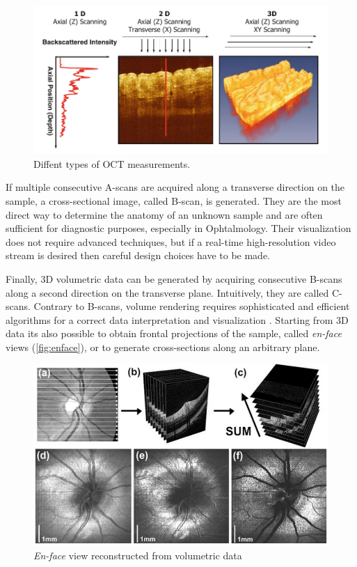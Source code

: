  \begin{figure}[hbt]
	\myfloatalign
	\includegraphics[width=\linewidth]{gfx/ch2/terminology}
	\caption{Diffent types of OCT measurements. \cite{Drexler2015}}\label{fig:terminology}
\end{figure}

If multiple consecutive A-scans are acquired along a transverse direction on the sample, a cross-sectional image, called B-scan, is generated. They are the most direct way to determine the anatomy of an unknown sample and are often sufficient for diagnostic purposes, especially in Ophtalmology. Their visualization does not require advanced techniques, but if a real-time high-resolution video stream is desired then careful design choices have to be made. 

Finally, 3D volumetric data can be generated by acquiring consecutive B-scans along a second direction on the transverse plane. Intuitively, they are called C-scans. Contrary to B-scans, volume rendering requires sophisticated and efficient algorithms for a correct data interpretation and visualization \cite{Lacroute1994,Cabral1994,Engel2001}. Starting from 3D data its also possible to obtain frontal projections of the sample, called \emph{en-face} views (\autoref{fig:enface}), or to generate cross-sections along an arbitrary plane.

 \begin{figure}[hbt]
	\myfloatalign
	\includegraphics[width=\linewidth]{gfx/ch2/enface}
	\caption{\emph{En-face} view reconstructed from volumetric data\cite{Drexler2015}}\label{fig:enface}
\end{figure}

